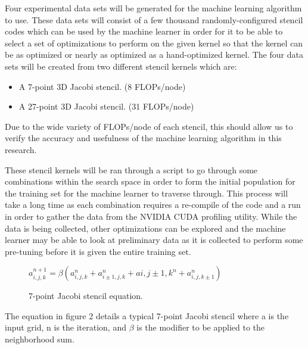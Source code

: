 \documentclass[conference]{IEEEtran}
\begin{document}
	Four experimental data sets will be generated for the machine learning algorithm to use. These data sets will consist of a few thousand randomly-configured stencil codes which can be used by the machine learner in order for it to be able to select a set of optimizations to perform on the given kernel so that the kernel can be as optimized or nearly as optimized as a hand-optimized kernel. The four data sets will be created from two different stencil kernels which are:
	
\begin{itemize}
	\item A 7-point 3D Jacobi stencil. (8 FLOPs/node)
	\item A 27-point 3D Jacobi stencil. (31 FLOPs/node)
\end{itemize}

	Due to the wide variety of FLOPs/node of each stencil, this should allow us to verify the accuracy and usefulness of the machine learning algorithm in this research.

	These stencil kernels will be ran through a script to go through some combinations within the search space in order to form the initial population for the training set for the machine learner to traverse through. This process will take a long time as each combination requires a re-compile of the code and a run in order to gather the data from the NVIDIA CUDA profiling utility. While the data is being collected, other optimizations can be explored and the machine learner may be able to look at preliminary data as it is collected to perform some pre-tuning before it is given the entire training set.

\begin{figure}[h!]
	\centering
$a_{i,j,k}^{n+1} = \beta(a_{i,j,k}^n + a_{i\pm1,j,k}^n + a{i,j\pm1,k}^n + a_{i,j,k\pm1}^n)$
	\caption{7-point Jacobi stencil equation.}
\end{figure}

	The equation in figure 2 details a typical 7-point Jacobi stencil where a is the input grid, n is the iteration, and $\beta$ is the modifier to be applied to the neighborhood sum.
	
\end{document}
